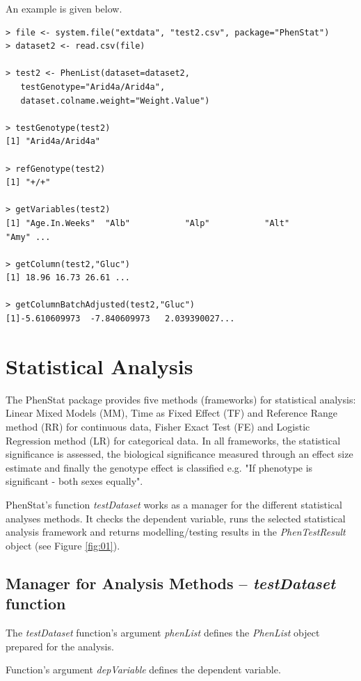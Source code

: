 \documentclass[12pt,a4paper]{article}
\begin{document}
An example is given below.


\begingroup
    \fontsize{8pt}{12pt}\selectfont
\begin{verbatim}
> file <- system.file("extdata", "test2.csv", package="PhenStat") 
> dataset2 <- read.csv(file)

> test2 <- PhenList(dataset=dataset2,
   testGenotype="Arid4a/Arid4a",
   dataset.colname.weight="Weight.Value")

> testGenotype(test2)
[1] "Arid4a/Arid4a"

> refGenotype(test2)
[1] "+/+"

> getVariables(test2)
[1] "Age.In.Weeks"  "Alb"           "Alp"           "Alt"           "Amy" ...

> getColumn(test2,"Gluc")
[1] 18.96 16.73 26.61 ...

> getColumnBatchAdjusted(test2,"Gluc")
[1]-5.610609973  -7.840609973   2.039390027...

\end{verbatim}
\endgroup
\section{Statistical Analysis}
The PhenStat package provides five methods (frameworks) for statistical analysis: Linear Mixed Models (MM), Time as Fixed Effect (TF) and Reference Range method (RR) for continuous data, Fisher Exact Test (FE) and Logistic Regression method (LR) for categorical data. In all frameworks, 
the statistical significance is assessed, the biological significance measured through an effect size estimate and finally the genotype effect is classified e.g. "If phenotype is significant - both sexes equally".  


PhenStat's function \textit{testDataset} works as a manager for the different statistical analyses methods. It checks the dependent variable, runs the selected statistical analysis framework and
 returns modelling\slash testing results in the \textit{PhenTestResult} object (see Figure \ref{fig:01}). 

\subsection{Manager for Analysis Methods -- \textit{testDataset} function}
The \textit{testDataset} function's argument \textit{phenList} defines the \textit{PhenList} object prepared for the analysis.

Function's argument \textit{depVariable} defines the dependent variable.
\end{document}

